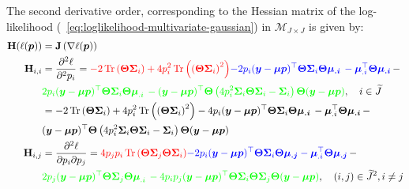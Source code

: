 \documentclass[long, final]{jobim}
\DeclareMathOperator*{\Tr}{Tr}
\begin{document}
The second derivative order, corresponding to the Hessian matrix of the log-likelihood (\equationname~\ref{eq:loglikelihood-multivariate-gaussian}) in $\mathcal{M}_{J \times J}$ is given by: 
\begin{equation}
    \label{eq:hessian-log-likelihood-unconstrained}
\begin{aligned}
\mathbf{H}(\ell(\boldsymbol{p})) &= \mathbf{J}\left( \nabla \ell (\boldsymbol{p})\right)\\
\mathbf{H}_{i,i}& =
   \frac{\partial^2 \ell}{\partial^2 p_i} =
\textcolor{red}{-2\Tr \left(\boldsymbol{\Theta}\boldsymbol{\Sigma}_i\right) + 4p_i^2 \Tr \left(\left(\boldsymbol{\Theta}\boldsymbol{\Sigma}_i\right)^2\right)} 
\textcolor{blue}{-2p_i(\boldsymbol{y} - \boldsymbol{\mu} \boldsymbol{p})^\top\boldsymbol{\Theta} \boldsymbol{\Sigma}_i \boldsymbol{\Theta} \boldsymbol{\mu_{.i}}\, - \boldsymbol{\mu}_{.i}^\top\boldsymbol{\Theta} \boldsymbol{\mu_{.i}}} \, - \\
& \textcolor{green}{2p_i (\boldsymbol{y} - \boldsymbol{\mu} \boldsymbol{p})^\top \boldsymbol{\Theta}\boldsymbol{\Sigma}_i\boldsymbol{\Theta}\boldsymbol{\mu}_{.i} \, - 
(\boldsymbol{y} - \boldsymbol{\mu} \boldsymbol{p})^\top\boldsymbol{\Theta} \left(4p_i^2 \boldsymbol{\Sigma}_i \boldsymbol{\Theta} \boldsymbol{\Sigma}_i - \boldsymbol{\Sigma}_i \right)\boldsymbol{\Theta} (\boldsymbol{y} - \boldsymbol{\mu} \boldsymbol{p})}, \quad i \in \widetilde{J} \\
& = -2\Tr \left(\boldsymbol{\Theta}\boldsymbol{\Sigma}_i\right) + 4p_i^2 \Tr \left(\left(\boldsymbol{\Theta}\boldsymbol{\Sigma}_i\right)^2\right) 
-4p_i(\boldsymbol{y} - \boldsymbol{\mu} \boldsymbol{p})^\top\boldsymbol{\Theta} \boldsymbol{\Sigma}_i \boldsymbol{\Theta} \boldsymbol{\mu_{.i}}\, - \boldsymbol{\mu}_{.i}^\top\boldsymbol{\Theta} \boldsymbol{\mu_{.i}} \, - \\
& (\boldsymbol{y} - \boldsymbol{\mu} \boldsymbol{p})^\top\boldsymbol{\Theta} \left(4p_i^2 \boldsymbol{\Sigma}_i \boldsymbol{\Theta} \boldsymbol{\Sigma}_i - \boldsymbol{\Sigma}_i \right)\boldsymbol{\Theta} (\boldsymbol{y} - \boldsymbol{\mu} \boldsymbol{p})\\
\mathbf{H}_{i,j} &=
   \frac{\partial^2 \ell}{\partial p_i \partial p_j} =
\textcolor{red}{4p_j p_i \Tr \left(\boldsymbol{\Theta}\boldsymbol{\Sigma}_j \boldsymbol{\Theta}\boldsymbol{\Sigma}_i \right)}
\textcolor{blue}{-2p_i(\boldsymbol{y} - \boldsymbol{\mu} \boldsymbol{p})^\top\boldsymbol{\Theta} \boldsymbol{\Sigma}_i \boldsymbol{\Theta} \boldsymbol{\mu_{.j}} - \boldsymbol{\mu}_{.i}^\top\boldsymbol{\Theta} \boldsymbol{\mu_{.j}}} \, - \\
& \textcolor{green}{2p_j (\boldsymbol{y} - \boldsymbol{\mu} \boldsymbol{p})^\top \boldsymbol{\Theta}\boldsymbol{\Sigma}_j\boldsymbol{\Theta} \boldsymbol{\mu}_{.i}\, - 
4p_ip_j(\boldsymbol{y} - \boldsymbol{\mu} \boldsymbol{p})^\top\boldsymbol{\Theta}\boldsymbol{\Sigma}_i \boldsymbol{\Theta} \boldsymbol{\Sigma}_j \boldsymbol{\Theta} (\boldsymbol{y} - \boldsymbol{\mu} \boldsymbol{p})}, \quad (i,j) \in \widetilde{J}^2, i \neq j
  \end{aligned}
\end{equation}
\end{document}
